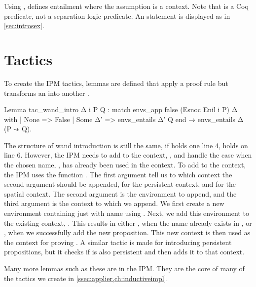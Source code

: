 \documentclass[thesis.tex]{subfiles}
\begin{document}
{Using ,  defines entailment where the assumption is a context. Note that  is a Coq predicate, not a separation logic predicate. An  statement is displayed as in \cref{sec:introsex}.

\section{Tactics}\label{sec:iristactics}
To create the IPM tactics, lemmas are defined that apply a proof rule but transforms an  into another .
\begin{coqcode}
  Lemma tac_wand_intro Δ i P Q :
    match envs_app false (Esnoc Enil i P) Δ with
    | None => False
    | Some Δ' => envs_entails Δ' Q
    end →
    envs_entails Δ (P -∗ Q).
\end{coqcode}
The structure of wand introduction is still the same, if  holds one line 4,  holds on line 6. However, the IPM needs to add  to the context, , and handle the case when the chosen name, , has already been used in the context. To add  to the context, the IPM uses the function . The first argument tell us to which context the second argument should be appended,  for the persistent context, and  for the spatial context. The second argument is the environment to append, and the third argument is the context to which we append. We first create a new environment containing just  with name  using . Next, we add this environment to the existing context, . This results in either , when the name already exists in , or , when we successfully add the new proposition. This new context is then used as the context for proving . A similar tactic is made for introducing persistent propositions, but it checks if  is also persistent and then adds it to that context.

Many more lemmas such as these are in the IPM. They are the core of many of the tactics we create in \cref{ssec:applier,ch:inductiveimpl}.

}
\end{document}
